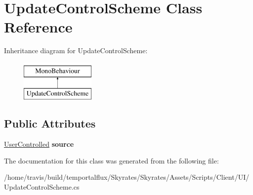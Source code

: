 \hypertarget{class_update_control_scheme}{\section{Update\-Control\-Scheme Class Reference}
\label{class_update_control_scheme}
}
Inheritance diagram for Update\-Control\-Scheme\-:\begin{figure}[H]
\begin{center}
\leavevmode
\includegraphics[height=2.000000cm]{class_update_control_scheme}
\end{center}
\end{figure}
\subsection*{Public Attributes}
\begin{DoxyCompactItemize}
\item 
\hypertarget{class_update_control_scheme_acc3d328020b55c8811b2905abba172a6}{\hyperlink{class_skyrates_1_1_common_1_1_a_i_1_1_user_controlled}{User\-Controlled} {\bfseries source}}\label{class_update_control_scheme_acc3d328020b55c8811b2905abba172a6}

\end{DoxyCompactItemize}


The documentation for this class was generated from the following file\-:\begin{DoxyCompactItemize}
\item 
/home/travis/build/temportalflux/\-Skyrates/\-Skyrates/\-Assets/\-Scripts/\-Client/\-U\-I/Update\-Control\-Scheme.\-cs\end{DoxyCompactItemize}
